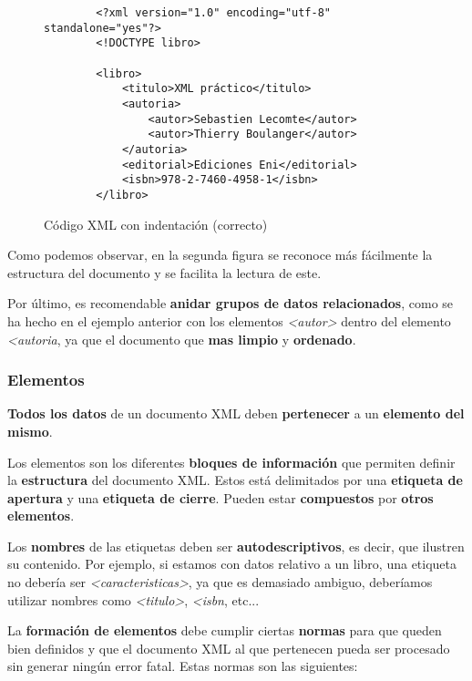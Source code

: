 \begin{figure}[h]
    \begin{tcolorbox}[sharp corners, colback=yellow!30, colframe=white!20]
        \scriptsize
        \begin{verbatim}
        <?xml version="1.0" encoding="utf-8" standalone="yes"?>
        <!DOCTYPE libro>

        <libro>
            <titulo>XML práctico</titulo>
            <autoria>
                <autor>Sebastien Lecomte</autor>
                <autor>Thierry Boulanger</autor>
            </autoria>
            <editorial>Ediciones Eni</editorial>
            <isbn>978-2-7460-4958-1</isbn>
        </libro>
        \end{verbatim}
    \end{tcolorbox}
    \caption{Código XML con indentación (correcto)}
\end{figure}

Como podemos observar, en la segunda figura se reconoce más fácilmente la estructura del documento y se facilita la lectura de este.

Por último, es recomendable \textbf{anidar grupos de datos relacionados}, como se ha hecho en el ejemplo anterior con los elementos \textit{<autor>} dentro del elemento \textit{<autoria}, ya que el documento que \textbf{mas limpio} y \textbf{ordenado}.

\subsubsection{Elementos}
\textbf{Todos los datos} de un documento XML deben \textbf{pertenecer} a un \textbf{elemento del mismo}.

Los elementos son los diferentes \textbf{bloques de información} que permiten definir la \textbf{estructura} del documento XML. Estos está delimitados por una \textbf{etiqueta de apertura} y una \textbf{etiqueta de cierre}. Pueden estar \textbf{compuestos} por \textbf{otros elementos}.

Los \textbf{nombres} de las etiquetas deben ser \textbf{autodescriptivos}, es decir, que ilustren su contenido. Por ejemplo, si estamos con datos relativo a un libro, una etiqueta no debería ser \textit{<caracteristicas>}, ya que es demasiado ambiguo, deberíamos utilizar nombres como \textit{<titulo>}, \textit{<isbn}, etc...

La \textbf{formación de elementos} debe cumplir ciertas \textbf{normas} para que queden bien definidos y que el documento XML al que pertenecen pueda ser procesado sin generar ningún error fatal. Estas normas son las siguientes:


